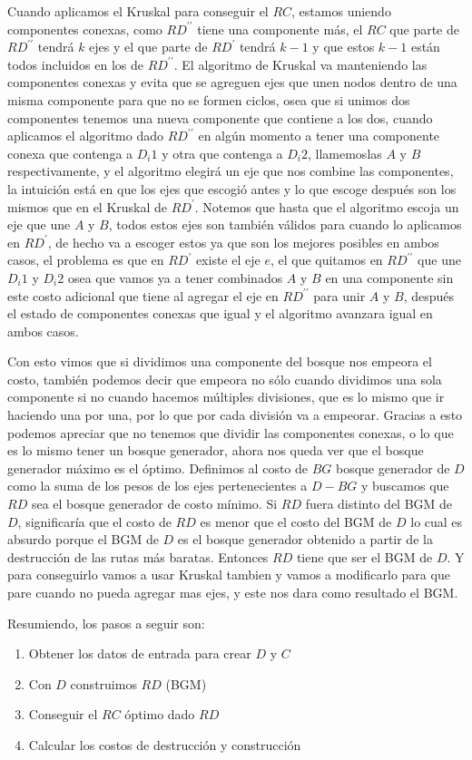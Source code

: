Cuando aplicamos el Kruskal para conseguir el $RC$, estamos uniendo componentes conexas, como $RD^{\prime\prime}$ tiene una componente más, el $RC$ que parte de $RD^{\prime\prime}$ tendrá $k$ ejes y el que parte de $RD^{\prime}$ tendrá $k-1$ y que estos $k-1$ están todos incluidos en los de $RD^{\prime\prime}$. El algoritmo de Kruskal va manteniendo las componentes conexas y evita que se agreguen ejes que unen nodos dentro de una misma componente para que no se formen ciclos, osea que si unimos dos componentes tenemos una nueva componente que contiene a los dos, cuando aplicamos el algoritmo dado $RD^{\prime\prime}$ en algún momento a tener una componente conexa que contenga a $D_i1$  y otra que contenga a $D_i2$, llamemoslas $A$ y $B$ respectivamente, y el algoritmo elegirá un eje que nos combine las componentes, la intuición está en que los ejes que escogió antes y lo que escoge después son los mismos que en el Kruskal de $RD^{\prime}$. Notemos que hasta que el algoritmo escoja un eje que une $A$ y $B$, todos estos ejes son también válidos para cuando lo aplicamos en $RD^{\prime}$, de hecho va a escoger estos ya que son los mejores posibles en ambos casos, el problema es que en $RD^{\prime}$ existe el eje $e$, el que quitamos en $RD^{\prime\prime}$ que une $D_i1$ y $D_i2$ osea que vamos ya a tener combinados $A$ y $B$ en una componente sin este costo adicional que tiene al agregar el eje en $RD^{\prime\prime}$ para unir $A$ y $B$, después el estado de componentes conexas que igual y el algoritmo avanzara igual en ambos casos.
\\
\par
Con esto vimos que si dividimos una componente del bosque nos empeora el costo, también podemos decir que empeora no sólo cuando dividimos una sola componente si no cuando hacemos múltiples divisiones, que es lo mismo que ir haciendo una por una, por lo que por cada división va a empeorar. Gracias a esto podemos apreciar que no tenemos que dividir las componentes conexas, o lo que es lo mismo tener un bosque generador, ahora nos queda ver que el bosque generador máximo es el óptimo. Definimos al costo de $BG$ bosque generador de $D$  como la suma de los pesos de los ejes pertenecientes a $D - BG$ y buscamos que $RD$ sea el bosque generador de costo mínimo. Si $RD$ fuera distinto del BGM de $D$, significaría que el costo de $RD$ es menor que el costo del BGM de $D$ lo cual es absurdo porque el BGM de $D$ es el bosque generador obtenido a partir de la destrucción de las rutas más baratas. Entonces $RD$ tiene que ser el BGM de $D$. Y para conseguirlo vamos a usar Kruskal tambien y vamos a modificarlo para que pare cuando no pueda agregar mas ejes, y este nos dara como resultado el BGM.
\\
\par
Resumiendo, los pasos a seguir son:
\begin{enumerate}
\item Obtener los datos de entrada para crear $D$ y $C$
\item Con $D$ construimos $RD$ (BGM) 
\item Conseguir el $RC$ óptimo dado $RD$
\item Calcular los costos de destrucción y construcción
\end{enumerate}

